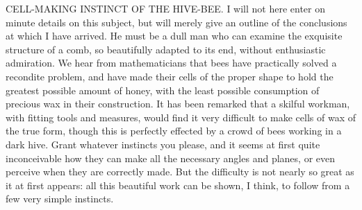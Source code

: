 CELL-MAKING INSTINCT OF THE HIVE-BEE.
I will not here enter on minute details on this subject, but will merely give an outline of the conclusions at which I have arrived. He must be a dull man who can examine the exquisite structure of a comb, so beautifully adapted to its end, without enthusiastic admiration. We hear from mathematicians that bees have practically solved a recondite problem, and have made their cells of the proper shape to hold the greatest possible amount of honey, with the least possible consumption of precious wax in their construction. It has been remarked that a skilful workman, with fitting tools and measures, would find it very difficult to make cells of wax of the true form, though this is perfectly effected by a crowd of bees working in a dark hive. Grant whatever instincts you please, and it seems at first quite inconceivable how they can make all the necessary angles and planes, or even perceive when they are correctly made. But the difficulty is not nearly so great as it at first appears: all this beautiful work can be shown, I think, to follow from a few very simple instincts.
